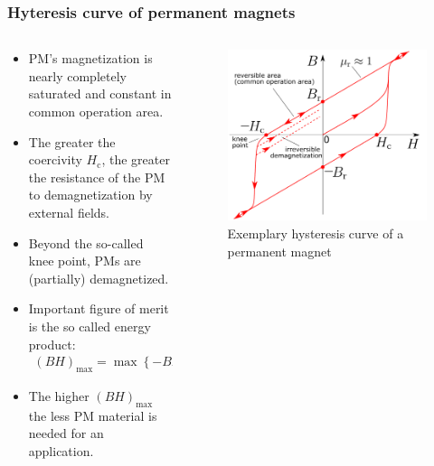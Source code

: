 \begin{frame}
	\frametitle{Hyteresis curve of permanent magnets}
	\begin{columns}
		\begin{column}{0.45\textwidth}
            \begin{itemize}
                \item PM's magnetization is nearly  completely saturated and constant in common operation area.
                \item The greater the coercivity $H_\mathrm{c}$, the greater the resistance of the PM to demagnetization by external fields.
                \item Beyond the so-called knee point, PMs are (partially) demagnetized.
                \item Important figure of merit is the so called energy product:
                \begin{align}
                    (BH)_{\max} = \max \left\{- B H \right\}.
                \end{align}
                \item The higher $(BH)_{\max}$ the less PM material is needed for an application.
            \end{itemize}
		\end{column}
        \hfill
		\begin{column}{0.42\textwidth}
            \vspace{-0.2cm}
			\begin{figure}
				\centering
				\includegraphics[height=0.6\textheight]{fig/lec02/Hyteresis_curve_PM.pdf}
				\caption{Exemplary hysteresis curve of a permanent magnet}
			\end{figure}
		\end{column}
		\end{columns}
\end{frame}

